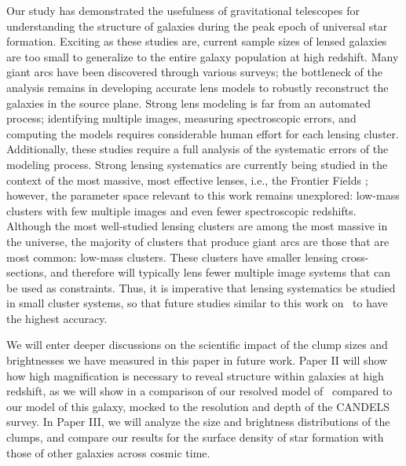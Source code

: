Our study has demonstrated the usefulness of gravitational telescopes for understanding the structure of galaxies during the peak epoch of universal star formation. Exciting as these studies are, current sample sizes of lensed galaxies are too small to generalize to the entire galaxy population at high redshift. Many giant arcs have been discovered through various surveys; the bottleneck of the analysis remains in developing accurate lens models to robustly reconstruct the galaxies in the source plane. Strong lens modeling is far from an automated process; identifying multiple images, measuring spectroscopic errors, and computing the models requires considerable human effort for each lensing cluster. Additionally, these studies require a full analysis of the systematic errors of the modeling process. Strong lensing systematics are currently being studied in the context of the most massive, most effective lenses, i.e., the Frontier Fields \citep[see][]{Meneghetti:2016xe,Johnson:2016rt}; however, the parameter space relevant to this work remains unexplored: low-mass clusters with few multiple images and even fewer spectroscopic redshifts. Although the most well-studied lensing clusters are among the most massive in the universe, the majority of clusters that produce giant arcs are those that are most common: low-mass clusters. These clusters have smaller lensing cross-sections, and therefore will typically lens fewer multiple image systems that can be used as constraints. Thus, it is imperative that lensing systematics be studied in small cluster systems, so that future studies similar to this work on \giantarc\ to have the highest accuracy.

We will enter deeper discussions on the scientific impact of the clump sizes and brightnesses we have measured in this paper in future work. Paper II will show how high magnification is necessary to reveal structure within galaxies at high redshift, as we will show in a comparison of our resolved model of \giantarc\ compared to our model of this galaxy, mocked to the resolution and depth of the CANDELS survey. In Paper III, we will analyze the size and brightness distributions of the clumps, and compare our results for the surface density of star formation with those of other galaxies across cosmic time.